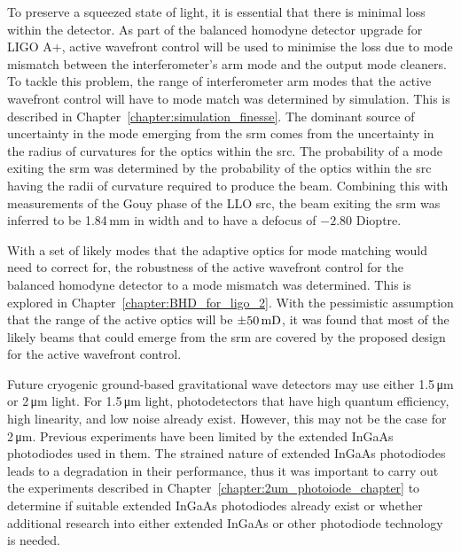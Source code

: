 \par
To preserve a squeezed state of light, it is essential that there is minimal loss within the detector. As part of the balanced homodyne detector upgrade for LIGO A+, active wavefront control will be used to minimise the loss due to mode mismatch between the interferometer's arm mode and the output mode cleaners. To tackle this problem, the range of interferometer arm modes that the active wavefront control will have to mode match was determined by simulation. This is described in Chapter~\ref{chapter:simulation_finesse}. The dominant source of uncertainty in the mode emerging from the \gls{srm} comes from the uncertainty in the radius of curvatures for the optics within the \gls{src}. The probability of a mode exiting the \gls{srm} was determined by the probability of the optics within the \gls{src} having the radii of curvature required to produce the beam. Combining this with measurements of the Gouy phase of the LLO \gls{src}, the beam exiting the \gls{srm} was inferred to be 1.84\,mm in width and to have a defocus of $-2.80$ Dioptre.
\par
With a set of likely modes that the adaptive optics for mode matching would need to correct for, the robustness of the active wavefront control for the balanced homodyne detector to a mode mismatch was determined. This is explored in Chapter~\ref{chapter:BHD_for_ligo_2}. With the pessimistic assumption that the range of the active optics will be $\pm50\,\rm{mD}$, it was found that most of the likely beams that could emerge from the \gls{srm} are covered by the proposed design for the active wavefront control. 
\par
Future cryogenic ground-based gravitational wave detectors may use either 1.5\,\si{\micro\metre} or 2\,\si{\micro\metre} light. For 1.5\,\si{\micro\metre} light, photodetectors that have high quantum efficiency, high linearity, and low noise already exist. However, this may not be the case for 2\,\si{\micro\metre}. Previous experiments have been limited by the extended InGaAs photodiodes used in them. The strained nature of extended InGaAs photodiodes leads to a degradation in their performance, thus it was important to carry out the experiments described in Chapter~\ref{chapter:2um_photoiode_chapter} to determine if suitable extended InGaAs photodiodes already exist or whether additional research into either extended InGaAs or other photodiode technology is needed.
